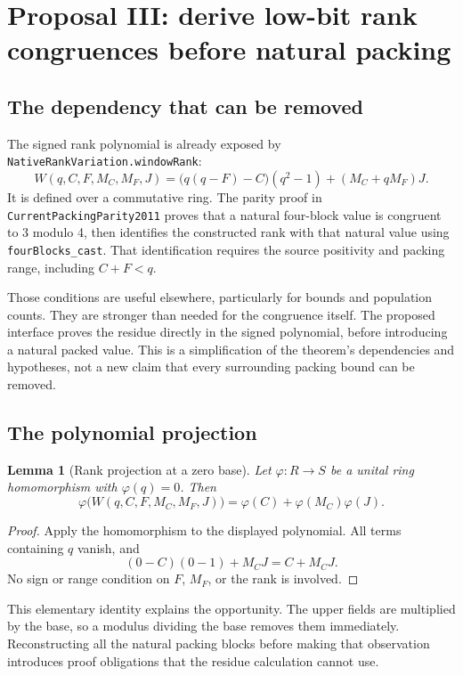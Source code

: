 \documentclass[11pt,a4paper]{article}
\newcommand{\code}[1]{\texttt{#1}}
\newtheorem{lemma}[proposition]{Lemma}
\begin{document}
\section{Proposal III: derive low-bit rank congruences before natural packing}

\subsection{The dependency that can be removed}

The signed rank polynomial is already exposed by \code{NativeRankVariation.windowRank}:
\[
 W(q,C,F,M_C,M_F,J)
 =\bigl(q(q-F)-C\bigr)(q^2-1)+(M_C+qM_F)J.
\]
It is defined over a commutative ring. The parity proof in \code{CurrentPackingParity2011} proves that a natural four-block value is congruent to 3 modulo 4, then identifies the constructed rank with that natural value using \code{fourBlocks\_cast}. That identification requires the source positivity and packing range, including \(C+F<q\).\cite{variation,parity}

Those conditions are useful elsewhere, particularly for bounds and population counts. They are stronger than needed for the congruence itself. The proposed interface proves the residue directly in the signed polynomial, before introducing a natural packed value. This is a simplification of the theorem's dependencies and hypotheses, not a new claim that every surrounding packing bound can be removed.

\subsection{The polynomial projection}

\begin{lemma}[Rank projection at a zero base]
Let \(\varphi:R\to S\) be a unital ring homomorphism with \(\varphi(q)=0\). Then
\[
 \varphi\bigl(W(q,C,F,M_C,M_F,J)\bigr)
 =\varphi(C)+\varphi(M_C)\varphi(J).
\]
\end{lemma}

\begin{proof}
Apply the homomorphism to the displayed polynomial. All terms containing \(q\) vanish, and
\[
 (0-C)(0-1)+M_CJ=C+M_CJ.
\]
No sign or range condition on \(F\), \(M_F\), or the rank is involved.
\end{proof}

This elementary identity explains the opportunity. The upper fields are multiplied by the base, so a modulus dividing the base removes them immediately. Reconstructing all the natural packing blocks before making that observation introduces proof obligations that the residue calculation cannot use.
\end{document}
